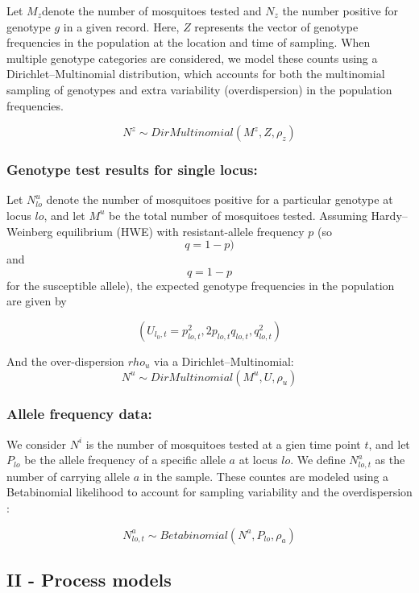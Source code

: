 \documentclass[
]{article}
\begin{document}
Let \(M_z\)denote the number of mosquitoes tested and \(N_z\) the number
positive for genotype \(g\) in a given record. Here, \(Z\) represents
the vector of genotype frequencies in the population at the location and
time of sampling. When multiple genotype categories are considered, we
model these counts using a Dirichlet--Multinomial distribution, which
accounts for both the multinomial sampling of genotypes and extra
variability (overdispersion) in the population frequencies.

\[
N^{z} \sim DirMultinomial( M^{z}, Z, \rho_z)
\]

\subsubsection{Genotype test results for single
locus:}\label{genotype-test-results-for-single-locus}

Let \(N_{lo}^u\) denote the number of mosquitoes positive for a
particular genotype at locus \(lo\), and let \(M^{u}\) be the total
number of mosquitoes tested. Assuming Hardy--Weinberg equilibrium (HWE)
with resistant-allele frequency \(p\) (so \[𝑞= 1 − p)\] and
\[q = 1 − p\] for the susceptible allele), the expected genotype
frequencies in the population are given by

\[(U_{l_0,t} = p_{lo,t}^2, 2p_{lo,t} q_{lo,t}, q_{lo,t}^2)\]

And the over-dispersion \(rho_{u}\) via a Dirichlet--Multinomial: \[
N^{u} \sim DirMultinomial (M^{u}, U, \rho_{u})
\]

\subsubsection{Allele frequency data:}\label{allele-frequency-data}

We consider \(N^{i}\) is the number of mosquitoes tested at a gien time
point \(t\), and let \(P_{lo}\) be the allele frequency of a specific
allele \(a\) at locus \(lo\). We define \(N_{lo,t}^{a}\) as the number
of carrying allele \(a\) in the sample. These countes are modeled using
a Betabinomial likelihood to account for sampling variability and the
overdispersion :

\[  
N_{lo,t}^{a} \sim Betabinomial (N^{a}, P_{lo}, \rho_{a})
\]

\subsection{II - Process models}\label{ii---process-models}
\end{document}
